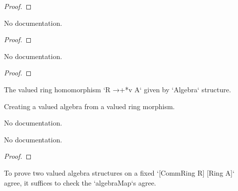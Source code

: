 \begin{proof}
    \leanok
\end{proof}

\begin{theorem}\label{ValAlgEquiv.one_apply}
        \leanok
                No documentation.
    \end{theorem}

\begin{proof}
    \leanok
\end{proof}

\begin{theorem}\label{ValAlgEquiv.mul_apply}
        \leanok
                No documentation.
    \end{theorem}

\begin{proof}
    \leanok
\end{proof}

\begin{definition}\label{valAlgebraMap}
        \leanok
                The valued ring homomorphism `R →+*v A` given by `Algebra` structure.
    \end{definition}

\begin{definition}\label{ValRingHom.toValAlgebra'}
        \leanok
                Creating a valued algebra from a valued ring morphism.
    \end{definition}

\begin{definition}\label{ValRingHom.toValAlgebra}
        \leanok
                No documentation.
    \end{definition}

\begin{theorem}\label{ValRingHom.valAlgebraMap_toValAlgebra}
        \leanok
                No documentation.
    \end{theorem}

\begin{proof}
    \leanok
\end{proof}

\begin{theorem}\label{ValAlgebra.valAlgebra_ext}
        \leanok
                To prove two valued algebra structures on a fixed `[CommRing R] [Ring A]` agree,
it suffices to check the `algebraMap`s agree.
    \end{theorem}

